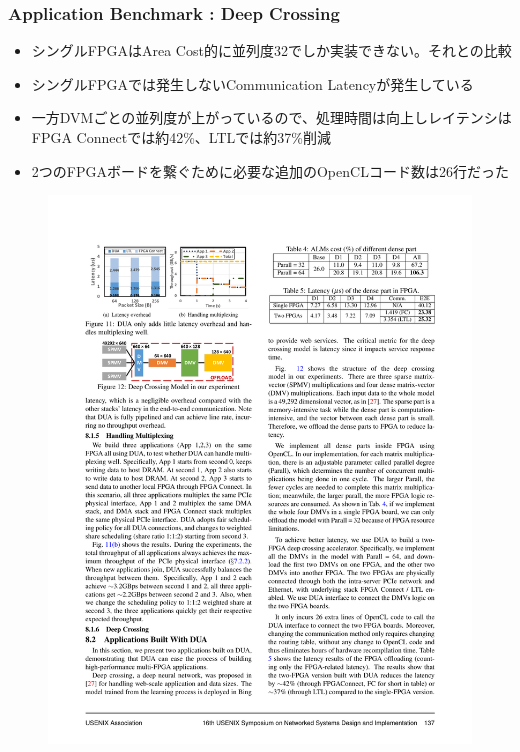 \documentclass[dvipdfmx,9pt,notheorems]{beamer}
\theoremstyle{definition}
\begin{document}
\begin{frame}\frametitle{Application Benchmark : Deep Crossing}
	\begin{itemize}
			\item シングルFPGAはArea Cost的に並列度32でしか実装できない。それとの比較
			\item シングルFPGAでは発生しないCommunication Latencyが発生している
			\item 一方DVMごとの並列度が上がっているので、処理時間は向上しレイテンシはFPGA Connectでは約42\%、LTLでは約37\%削減
			\item 2つのFPGAボードを繋ぐために必要な追加のOpenCLコード数は26行だった
	\end{itemize}
  \begin{figure}[htb]
		\includegraphics[scale=1.0]{fig/table5.pdf}
  \end{figure}
\end{frame}
\end{document}
